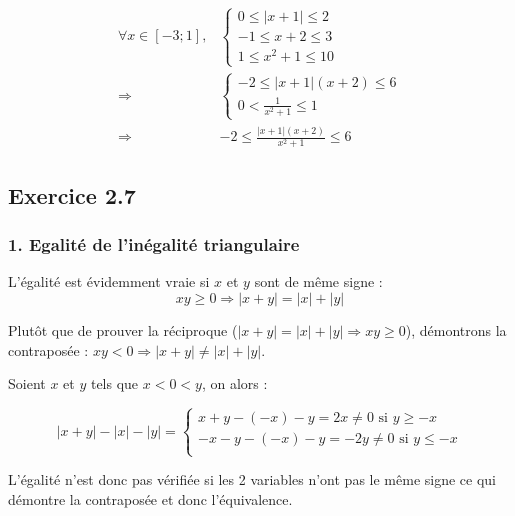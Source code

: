 \documentclass{report}
\begin{document}
\begin{equation*}
	\begin{split}
		\forall x \in [-3 ; 1],
		& \begin{cases}
			0 \leq |x+1| \leq 2 \\
		    -1 \leq x+2 \leq 3 \\
		    1 \leq x^2 + 1 \leq 10
		\end{cases} \\
		\Longrightarrow 
		& \begin{cases}
			-2 \leq |x+1|(x+2) \leq 6 \\
			0 < \frac{1}{x^2 + 1} \leq 1
		\end{cases} \\
		\Longrightarrow 
		& -2 \leq \frac{|x+1|(x+2)}{x^2 + 1} \leq 6 
	\end{split}
\end{equation*}

\subsection*{Exercice 2.7}

\subsubsection*{1. Egalité de l'inégalité triangulaire}

L'égalité est évidemment vraie si $x$ et $y$ sont de même signe :
\begin{displaymath}
	xy \geq 0 \Longrightarrow |x+y| = |x| + |y|
\end{displaymath}

Plutôt que de prouver la réciproque ($|x+y| = |x| + |y| \Longrightarrow xy \geq 0$), démontrons
la contraposée : $xy < 0 \Longrightarrow |x+y| \neq |x| + |y|$.

Soient $x$ et $y$ tels que $ x < 0 < y$, on alors :

\begin{displaymath}
		|x+y| - |x| - |y|
		= \begin{cases}
			x+y-(-x)-y = 2x \neq 0 \text { si } y \geq -x \\
			-x-y-(-x)-y = -2y \neq 0 \text { si } y \leq -x \\
		\end{cases}
\end{displaymath}

L'égalité n'est donc pas vérifiée si les 2 variables n'ont pas le même signe ce qui démontre la contraposée
et donc l'équivalence.
\end{document}
